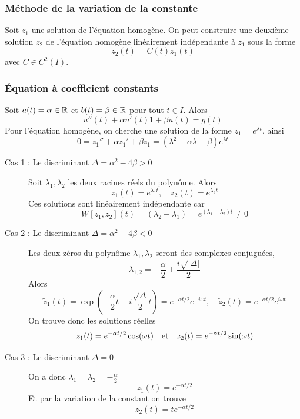 \subsubsection*{Méthode de la variation de la constante}
Soit $z_1$ une solution de l'équation homogène. On peut construire une deuxième solution $z_2$ de l'équation homogène linéairement indépendante à $z_1$ sous la forme
\[
z_2(t) = C(t) z_1(t)
\]
avec $C \in C^2(I)$. 

\subsubsection{Équation à coefficient constants}
Soit $a(t) = \alpha \in \mathbb R$ et $b(t) = \beta \in \mathbb R$ pour tout $t \in I$. Alors
\[
u''(t) + \alpha u'(t) 1+ \beta u(t) = g(t)
\]
Pour l'équation homogène, on cherche une solution de la forme $z_1 = e^{\lambda t}$,  ainsi
 \[
 0 = z_1'' + \alpha z_1' + \beta z_1 = (\lambda^2 + \alpha \lambda + \beta) e^{\lambda t}
 \]
 
 \begin{description}
 	\item[Cas 1 :  Le discriminant $\Delta = \alpha^2 - 4 \beta > 0$] Soit $\lambda_1, \lambda_2$ les deux racines réels du polynôme. Alors
 	\[
 	z_1(t) = e^{\lambda_1 t}, \quad z_2(t) = e^{\lambda_2 t}
 	\]
 	Ces solutions sont linéairement indépendante car
 	\[
 	W[z_1, z_2](t) = (\lambda_2 - \lambda_1) = e^{(\lambda_1 + \lambda_2)t} \neq 0
 	\]
 	\item[Cas 2 : Le discriminant $\Delta = \alpha^2 - 4 \beta < 0$] Les deux zéros du polynôme $\lambda_1, \lambda_2$ seront des complexes conjuguées,
 	\[
 	\lambda_{1,2} = -\frac\alpha2 \pm \frac{i \sqrt{|\Delta|}}{2}
 	\]
 	Alors
 	\[
 	\tilde z_1(t) = \exp\left( - \frac\alpha2 t - i  \frac{\sqrt \Delta}{2} t \right) = e^{-\alpha t/2} e^{-i \omega t}, \quad \tilde z_2(t) = e^{-\alpha t/2} e^{i \omega t}
 	\]
 	On trouve donc les solutions réelles 
 	\[
 	z_1(t) = e^{-\alpha t/2} \cos(\omega t) \quad \text{et} \quad z_2(t) = e^{-\alpha t/2}\sin(\omega t)
 	\]
 	\item[Cas 3 : Le discriminant $\Delta = 0$] On a donc $\lambda_1 = \lambda_2 = - \frac\alpha2$
 	\[
 	z_1(t) = e^{-\alpha t/2}
 	\]
 	Et par la variation de la constant on trouve
 	\[
 	z_2(t)	 = te^{-\alpha t/2}
 	\]
 \end{description}



	



